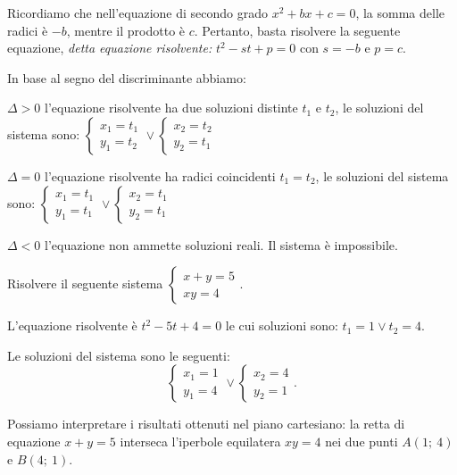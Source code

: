 Ricordiamo che nell'equazione di secondo grado \(x^2+bx+c=0\), la somma delle 
radici è \(-b\), mentre il prodotto è \(c\). Pertanto, basta risolvere la 
seguente 
equazione, \emph{detta equazione risolvente: } \(t^2-st+p=0\) con \(s=-b\) e 
\(p=c\).

In base al segno del discriminante abbiamo:
\begin{itemize*}
\item \(\Delta >0\) l'equazione risolvente ha due soluzioni distinte \(t_1\) 
e \(t_2\), le soluzioni del sistema sono: 
\(\left\{\begin{array}{l}{x_1=t_1}\\{y_1=t_2}\end{array}\right.\vee 
\left\{\begin{array}{l}{x_2=t_2}\\{y_2=t_1}\end{array}\right.\)
\item \(\Delta =0\) l'equazione risolvente ha radici coincidenti \(t_1=t_2\), 
le soluzioni del sistema sono: 
\(\left\{\begin{array}{l}{x_1=t_1}\\{y_1=t_1}\end{array}\right.\vee 
\left\{\begin{array}{l}{x_2=t_1}\\{y_2=t_1}\end{array}\right.\)
\item \(\Delta <0\) l'equazione non ammette soluzioni reali. Il sistema è 
impossibile.
\end{itemize*}

\begin{esempio}
Risolvere il seguente sistema 
\(\left\{\begin{array}{l}{x+y=5}\\{xy=4}\end{array}\right.\).
\begin{multicols}{2}
L'equazione risolvente è \(t^2-5t+4=0\) le cui soluzioni sono: \(t_1=1\vee 
t_2=4\).

Le soluzioni del sistema sono le seguenti: \[ 
\left\{\begin{array}{l}{x_1=1}\\{y_1=4}\end{array}\right.\vee 
\left\{\begin{array}{l}{x_2=4}\\{y_2=1}\end{array}\right.. \]

Possiamo interpretare i risultati ottenuti nel piano cartesiano: la retta di 
equazione \(x+y=5\) interseca l'iperbole equilatera \({xy}=4\) nei due punti 
\(A(1;~4)\) e \(B(4;~1)\).
\begin{center}

\end{center}
\end{multicols}
\end{esempio}

